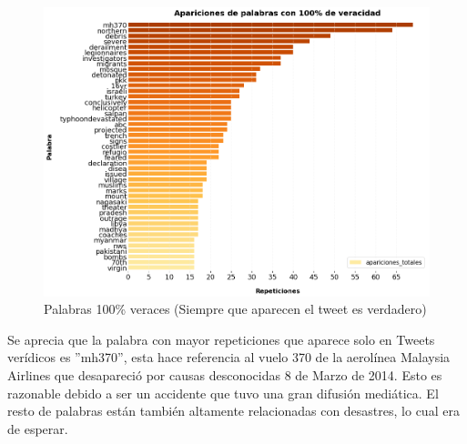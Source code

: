 \documentclass[titlepage,a4paper]{article}
\begin{document}
 
    
    \begin{figure}[H]
    \centering
    \includegraphics[width=1\textwidth]{graficos/Analisis Lexico Grafico/aparaciones_de_palabras_con_100_de_veracidad.png}
    \caption{Palabras 100\% veraces (Siempre que aparecen el tweet es verdadero)}
    \end{figure}
    
    Se aprecia que la palabra con mayor repeticiones que aparece solo en Tweets verídicos es ''mh370'', esta hace referencia al vuelo 370 de la aerolínea Malaysia Airlines que desapareció por causas desconocidas 8 de Marzo de 2014. Esto es razonable debido a ser un accidente que tuvo una gran difusión mediática. El resto de palabras están también altamente relacionadas con desastres, lo cual era de esperar. 
    
\end{document}
